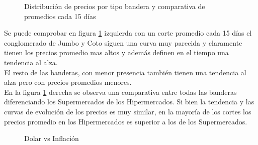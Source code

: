 \begin{figure}[h]
\centering
{}%
\hspace{0.25cm}%
\caption{Distribución de precios por tipo bandera y comparativa de promedios cada 15 días}
\label{Distr_comparativa}
\end{figure}


Se puede comprobar en figura \ref{Distr_comparativa} izquierda con un corte promedio cada 15 días el conglomerado de Jumbo y Coto siguen una curva muy parecida y claramente tienen los precios promedio mas altos y además definen en el tiempo una tendencia al alza.\\
El resto de las banderas, con menor presencia también tienen una tendencia al alza pero con precios promedios menores.\\
En la figura \ref{Distr_comparativa} derecha se observa una comparativa entre todas las banderas diferenciando los Supermercados de los Hipermercados. Si bien la tendencia y las curvas de evolución de los precios es muy similar, en la mayoría de los cortes los precios promedio en los Hipermercados es superior a los de los Supermercados.\\

\begin{figure}
\centering
{}%
\caption{Dolar vs Inflación}
\label{dolar_vs_inflasion}
\end{figure}

